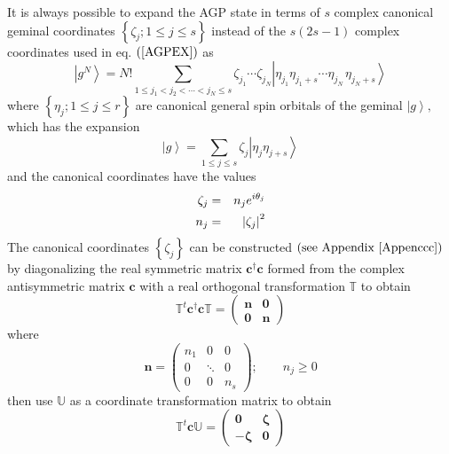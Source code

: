 \documentclass{article}
\begin{document}
It is always possible to expand the AGP state in terms of $s$ complex
canonical geminal coordinates\cite{Bloch1}\cite{Zumino1} $\left\{ \zeta
_{j};1\leq j\leq s\right\} $ instead of the $s\left( 2s-1\right) $ complex
coordinates used in eq. $\left( \ref{AGPEX}\right) $ as 
\begin{equation}
\left| g^{N}\right\rangle =N!\sum_{1\leq j_{1}<j_{2}<\cdots <j_{N}\leq
s}\zeta _{j_{1}}\cdots \zeta _{j_{N}}\left| \eta _{j_{1}}\eta
_{j_{1}+s}\cdots \eta _{j_{N}\,}\eta _{j_{N}+s}\right\rangle  \label{canexp}
\end{equation}%
where $\left\{ \eta _{j};1\leq j\leq r\right\} $ are canonical general spin
orbitals of the geminal $\left| g\right\rangle ,$ which has the expansion 
\begin{equation}
\left| g\right\rangle =\sum_{1\leq j\leq s}\zeta _{j}\left| \eta _{j}\eta
_{j+s}\right\rangle
\end{equation}%
and the canonical coordinates have the values 
\begin{eqnarray}
\zeta _{j} &=&n_{j}e^{i\theta _{j}}  \notag \\
n_{j} &=&\left| \zeta _{j}\right| ^{2}
\end{eqnarray}%
The canonical coordinates $\left\{ \zeta _{j}\right\} $ can be constructed $%
\left( \text{see Appendix \ref{Appenccc}}\right) $ by diagonalizing the real
symmetric matrix $\mathbf{c}^{\dagger }\mathbf{c}$ formed from the complex
antisymmetric matrix $\mathbf{c}$ with a real orthogonal transformation $%
\mathbb{T}$ to obtain 
\begin{equation}
\mathbb{T}^{t}\mathbf{c}^{\dagger }\mathbf{c}\mathbb{T=}\left( 
\begin{array}{cc}
\mathbf{n} & \mathbf{0} \\ 
\mathbf{0} & \mathbf{n}%
\end{array}%
\right)  \label{uccu}
\end{equation}%
where 
\begin{equation}
\mathbf{n=}\left( 
\begin{array}{ccc}
n_{1} & 0 & 0 \\ 
0 & \ddots & 0 \\ 
0 & 0 & n_{s}%
\end{array}%
\right) ;\qquad n_{j}\geq 0
\end{equation}%
then use $\mathbb{U}$ as a coordinate transformation matrix to obtain 
\begin{equation}
\mathbb{T}^{t}\mathbf{c}\mathbb{U}=\left( 
\begin{array}{cc}
\mathbf{0} & \mathbf{\zeta } \\ 
-\mathbf{\zeta } & \mathbf{0}%
\end{array}%
\right)  \label{ucu}
\end{equation}%
\end{document}
